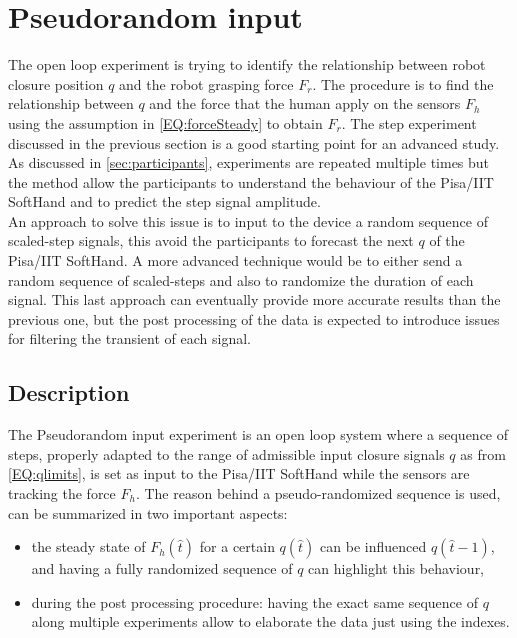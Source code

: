 \section{Pseudorandom input}
The open loop experiment is trying to identify the relationship between robot closure position $q$ and the robot grasping force $F_{r}$. The procedure is to find the relationship between $q$ and the force that the human apply on the sensors $F_{h}$ using the assumption in \ref{EQ:forceSteady} to obtain $F_{r}$. 
The step experiment discussed in the previous section is a good starting point for an advanced study. 
As discussed in \ref{sec:participants}, experiments are repeated multiple times but the method allow the participants to understand the behaviour of the Pisa/IIT SoftHand and to predict the step signal amplitude. \\
An approach to solve this issue is to input to the device a random sequence of scaled-step signals, this avoid the participants to forecast the next $q$ of the Pisa/IIT SoftHand. A more advanced technique would be to either send a random sequence of scaled-steps and also to randomize the duration of each signal. This last approach can eventually provide more accurate results than the previous one, but the post processing of the data is expected to introduce issues for filtering the transient of each signal.
\subsection{Description}
The Pseudorandom input experiment is an open loop system where a sequence of steps, properly adapted to the range of admissible input closure signals $q$ as from \ref{EQ:qlimits}, is set as input to the Pisa/IIT SoftHand while the sensors are tracking the force $F_{h}$.
The reason behind a pseudo-randomized sequence is used, can be summarized in two important aspects:
\begin{itemize}
\item the steady state of $F_{h}( \hat{t} )$ for a certain $q(\hat{t})$ can be influenced $q(\hat{t}-1)$, and having a fully randomized sequence of $q$ can highlight this behaviour,
\item during the post processing procedure: having the exact same sequence of $q$ along multiple experiments allow to elaborate the data just using the indexes.
\end{itemize}

